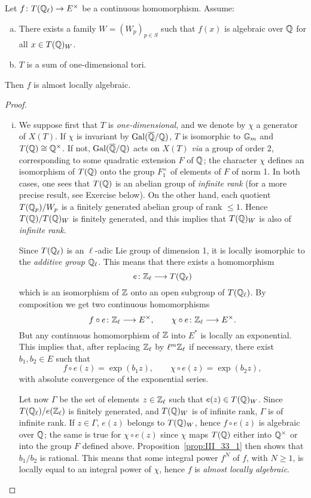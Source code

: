\begin{prop}\label{prop:III_33_2}
	Let $f\colon T(\mathbb{Q}_\ell) \to E^\times$ be a continuous homomorphism. Assume:
	\begin{enumerate}[(a)]
	\item There exists a family $W = (W_p)_{p\in S}$ such that $f(x)$ is
		algebraic over $\mathbb{Q}$ for all $x \in T(\mathbb{Q})_W$.
	\item\label{item:III_33_2b}
		$T$ is a sum of one-dimensional tori.
	\end{enumerate}
	Then $f$ is almost locally algebraic.
\end{prop}
\begin{proof}
\begin{enumerate}[i), wide]
\item\label{item:III_33_2i}
	We suppose first that $T$ is \emph{one-dimensional}, and we denote by
	$\chi$ a generator of $X(T)$. If $\chi$ is invariant by
	$\operatorname{Gal}(\overline{\mathbb{Q}}/\mathbb{Q})$, $T$ is isomorphic to $\mathbb{G}_m$ and $T(\mathbb{Q}) \cong
	\mathbb{Q}^\times$. If not, $\operatorname{Gal}(\overline{\mathbb{Q}}/\mathbb{Q})$ acts on $X(T)$ \emph{via} a group of
	order 2, corresponding to some quadratic
	\dpage
	extension $F$ of $\mathbb{Q}$; the character $\chi$ defines an isomorphism of
	$T(\mathbb{Q})$ onto the group $F_1^\times$ of elements of $F$ of norm 1. In both
	cases, one sees that $T(\mathbb{Q})$ is an abelian group of \emph{infinite
	rank} (for a more precise result, see Exercise below). On the other
	hand, each quotient $T(\mathbb{Q}_p)/W_p$ is a finitely generated abelian group
	of rank $\le 1$.  Hence $T(\mathbb{Q})/T(\mathbb{Q})_W$ is finitely generated, and this
	implies that $T(\mathbb{Q})_W$ is also of \emph{infinite rank}.

	Since $T(\mathbb{Q}_\ell)$ is an $\ell$-adic Lie group of dimension 1, it is
	locally isomorphic to the \emph{additive group} $\mathbb{Q}_\ell$. This means
	that there exists a homomorphism
	\[
		e \colon \mathbb{Z}_\ell \longrightarrow T(\mathbb{Q}_\ell)
	\]
	which is an isomorphism of $\mathbb{Z}$ onto an open subgroup of $T(\mathbb{Q}_\ell)$.
	By composition we get two continuous homomorphisms
	\[
		f \circ e\colon \mathbb{Z}_\ell \longrightarrow E^\times, \qquad
		\chi \circ e\colon \mathbb{Z}_\ell \longrightarrow E^\times.
	\]
	But any continuous homomorphism of $\mathbb{Z}$ into $E^*$ is locally an
	exponential. This implies that, after replacing $\mathbb{Z}_\ell$ by $\ell^m
	\mathbb{Z}_\ell$ if necessary, there exist $b_1, b_2 \in E$ such that
	\[
		f \circ e(z) = \exp(b_1 z), \qquad
		\chi\circ e(z) = \exp(b_2 z),
	\]
	with absolute convergence of the exponential series.

	Let now $\Gamma$ be the set of elements $z \in \mathbb{Z}_\ell$ such that $e(z)
	\in T(\mathbb{Q})_W$. Since $T(\mathbb{Q}_\ell)/e(\mathbb{Z}_\ell)$ is finitely generated, and
	$T(\mathbb{Q})_W$ is of infinite rank, $\Gamma$ is of infinite rank. If $z \in
	\Gamma$, $e(z)$
	\dpage
	belongs to $T(\mathbb{Q})_W$, hence $f \circ e(z)$ is algebraic over $\mathbb{Q}$; the
	same is true for $\chi\circ e(z)$ since $\chi$ maps $T(\mathbb{Q})$ either into
	$\mathbb{Q}^\times$ or into the group $F$ defined above.
	Proposition~\ref{prop:III_33_1} then shows that $b_1/b_2$ is rational.
	This means that some integral power $f^N$ of $f$, with $N \ge 1$, is
	locally equal to an integral power of $\chi$, hence $f$ is \emph{almost
	locally algebraic}.


\end{enumerate}
\end{proof}
